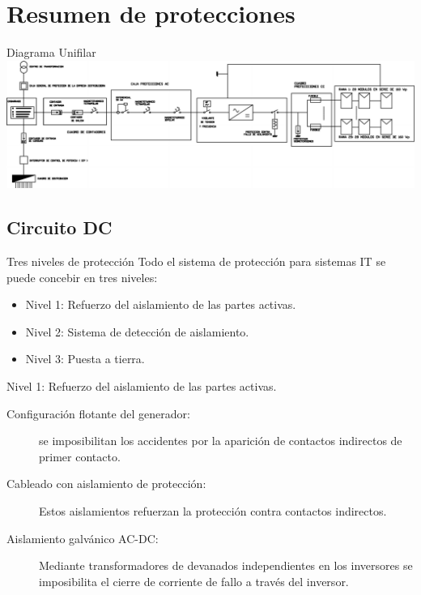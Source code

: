 \documentclass[xcolor={usenames,svgnames,dvipsnames}]{beamer}
\begin{document}
\section{Resumen de protecciones}
\label{sec-5}

\begin{frame}[plain,label=sec-5-0-1]{Diagrama Unifilar}
\includegraphics[width=1.2\textwidth]{../figs/UnifilarCR1.pdf}
\end{frame}

\subsection{Circuito DC}
\label{sec-5-1}

\begin{frame}[label=sec-5-1-1]{Tres niveles de protección}
Todo el sistema de protección para sistemas IT se puede concebir en tres
niveles:

\begin{itemize}
\item Nivel 1: Refuerzo del aislamiento de las partes activas.

\item Nivel 2: Sistema de detección de aislamiento.

\item Nivel 3: Puesta a tierra.
\end{itemize}
\end{frame}

\begin{frame}[label=sec-5-1-2]{Nivel 1: Refuerzo del aislamiento de las partes activas.}
\begin{description}
\item[{Configuración flotante del generador:}] se imposibilitan los
accidentes por la aparición de contactos indirectos de primer
contacto.

\item[{Cableado con aislamiento de protección:}] Estos aislamientos
refuerzan la protección contra contactos indirectos.

\item[{Aislamiento galvánico AC-DC:}] Mediante transformadores de devanados
independientes en los inversores se imposibilita el cierre de
corriente de fallo a través del inversor.
\end{description}
\end{frame}
\end{document}
